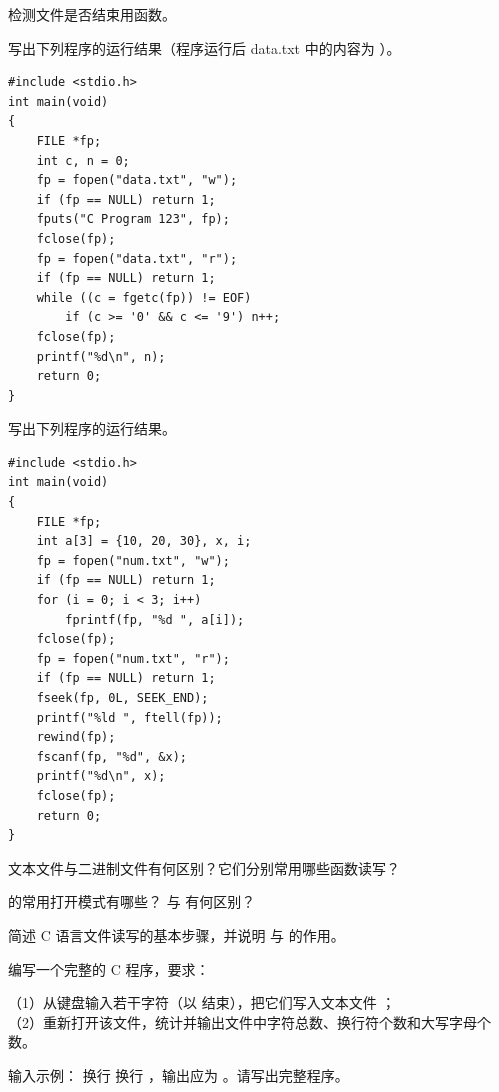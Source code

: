 \documentclass[a4paper,11pt]{article}
\begin{document}
\q 检测文件是否结束用\fillblanks[1.2cm]函数。

\q 写出下列程序的运行结果（程序运行后 data.txt 中的内容为 ）。
\begin{lstlisting}[language={[custom]C}]
#include <stdio.h>
int main(void)
{
    FILE *fp;
    int c, n = 0;
    fp = fopen("data.txt", "w");
    if (fp == NULL) return 1;
    fputs("C Program 123", fp);
    fclose(fp);
    fp = fopen("data.txt", "r");
    if (fp == NULL) return 1;
    while ((c = fgetc(fp)) != EOF)
        if (c >= '0' && c <= '9') n++;
    fclose(fp);
    printf("%d\n", n);
    return 0;
}
\end{lstlisting}
\anslines{2.4cm}

\q 写出下列程序的运行结果。
\begin{lstlisting}[language={[custom]C}]
#include <stdio.h>
int main(void)
{
    FILE *fp;
    int a[3] = {10, 20, 30}, x, i;
    fp = fopen("num.txt", "w");
    if (fp == NULL) return 1;
    for (i = 0; i < 3; i++)
        fprintf(fp, "%d ", a[i]);
    fclose(fp);
    fp = fopen("num.txt", "r");
    if (fp == NULL) return 1;
    fseek(fp, 0L, SEEK_END);
    printf("%ld ", ftell(fp));
    rewind(fp);
    fscanf(fp, "%d", &x);
    printf("%d\n", x);
    fclose(fp);
    return 0;
}
\end{lstlisting}
\anslines{2.6cm}

\q 文本文件与二进制文件有何区别？它们分别常用哪些函数读写？\anslines{3.2cm}

\q {} 的常用打开模式有哪些？ 与  有何区别？\anslines{3.2cm}

\q 简述 C 语言文件读写的基本步骤，并说明  与  的作用。\anslines{3.2cm}

\newpage
{}
\q 编写一个完整的 C 程序，要求：
\par\vspace{0.15em}
\noindent（1）从键盘输入若干字符（以 \code{\#} 结束），把它们写入文本文件 ；\\
\noindent（2）重新打开该文件，统计并输出文件中字符总数、换行符个数和大写字母个数。

\noindent 输入示例： 换行  换行 \code{\#}，输出应为 。请写出完整程序。\anslines{4.0cm}
\end{document}
